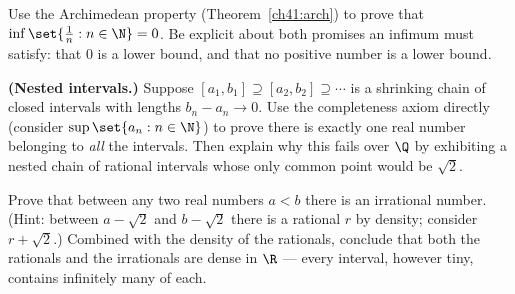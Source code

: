 \begin{exercise}
\label{ch41:ex-archimedean}
Use the Archimedean property (Theorem~\ref{ch41:arch}) to prove that
$\inf\set{\tfrac1n : n\in\N} = 0$. Be explicit about both promises an infimum must
satisfy: that $0$ is a lower bound, and that no positive number is a lower bound.
\end{exercise}

\begin{exercise}
\label{ch41:ex-nested}
\textbf{(Nested intervals.)} Suppose $[a_1,b_1] \supseteq [a_2,b_2] \supseteq \cdots$ is a
shrinking chain of closed intervals with lengths $b_n - a_n \to 0$. Use the completeness
axiom directly (consider $\sup\set{a_n : n\in\N}$) to prove there is exactly one real number
belonging to \emph{all} the intervals. Then explain why this fails over $\Q$ by exhibiting a
nested chain of rational intervals whose only common point would be $\sqrt2$.
\end{exercise}

\begin{exercise}
\label{ch41:ex-dense}
Prove that between any two real numbers $a < b$ there is an irrational number. (Hint:
between $a-\sqrt2$ and $b-\sqrt2$ there is a rational $r$ by density; consider $r+\sqrt2$.)
Combined with the density of the rationals, conclude that both the rationals and the
irrationals are dense in $\R$ --- every interval, however tiny, contains infinitely many of
each.
\end{exercise}
